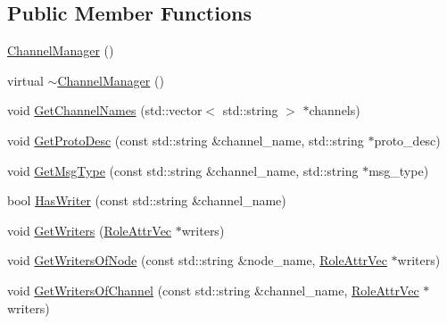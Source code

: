 \subsection*{Public Member Functions}
\begin{DoxyCompactItemize}
\item 
\hyperlink{classapollo_1_1cyber_1_1service__discovery_1_1ChannelManager_af4e4908c4172f7ff1703fea322611137}{Channel\-Manager} ()
\item 
virtual \hyperlink{classapollo_1_1cyber_1_1service__discovery_1_1ChannelManager_a32fb19451ed63f5bb92b4b2beb4eddcf}{$\sim$\-Channel\-Manager} ()
\item 
void \hyperlink{classapollo_1_1cyber_1_1service__discovery_1_1ChannelManager_aebc9f5fa682a8eba522a93ccebed3811}{Get\-Channel\-Names} (std\-::vector$<$ std\-::string $>$ $\ast$channels)
\item 
void \hyperlink{classapollo_1_1cyber_1_1service__discovery_1_1ChannelManager_a2259a9d33b8391ffb2ec307f6c442bc8}{Get\-Proto\-Desc} (const std\-::string \&channel\-\_\-name, std\-::string $\ast$proto\-\_\-desc)
\item 
void \hyperlink{classapollo_1_1cyber_1_1service__discovery_1_1ChannelManager_a06a205015433a25d5f2acf20eee4c445}{Get\-Msg\-Type} (const std\-::string \&channel\-\_\-name, std\-::string $\ast$msg\-\_\-type)
\item 
bool \hyperlink{classapollo_1_1cyber_1_1service__discovery_1_1ChannelManager_a2d481f65124c1cdb70b66b81055f667f}{Has\-Writer} (const std\-::string \&channel\-\_\-name)
\item 
void \hyperlink{classapollo_1_1cyber_1_1service__discovery_1_1ChannelManager_ada1e428556994da13575932c6feee98b}{Get\-Writers} (\hyperlink{classapollo_1_1cyber_1_1service__discovery_1_1ChannelManager_a3690fc3677abdb994d1de9b996f66cf6}{Role\-Attr\-Vec} $\ast$writers)
\item 
void \hyperlink{classapollo_1_1cyber_1_1service__discovery_1_1ChannelManager_a928e0afa8478cb244f3dd5d872694f38}{Get\-Writers\-Of\-Node} (const std\-::string \&node\-\_\-name, \hyperlink{classapollo_1_1cyber_1_1service__discovery_1_1ChannelManager_a3690fc3677abdb994d1de9b996f66cf6}{Role\-Attr\-Vec} $\ast$writers)
\item 
void \hyperlink{classapollo_1_1cyber_1_1service__discovery_1_1ChannelManager_a35bfdd2076a4789c23e9add4c868b5e7}{Get\-Writers\-Of\-Channel} (const std\-::string \&channel\-\_\-name, \hyperlink{classapollo_1_1cyber_1_1service__discovery_1_1ChannelManager_a3690fc3677abdb994d1de9b996f66cf6}{Role\-Attr\-Vec} $\ast$writers)

\end{DoxyCompactItemize}
